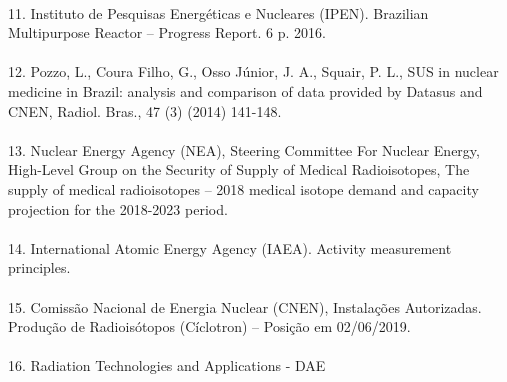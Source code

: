 \documentclass[12pt]{article}
\begin{document}
\\
11.  Instituto  de  Pesquisas  Energéticas  e  Nucleares 
(IPEN).  Brazilian  Multipurpose  Reactor  –  Progress 
Report.  6  p.  2016. 
\\
\\
12.  Pozzo,  L., Coura  Filho,  G., Osso  Júnior,  J.  A., 
Squair,  P.  L.,  SUS  in  nuclear  medicine  in  Brazil: 
analysis and comparison of data provided by Datasus 
and  CNEN,  Radiol.  Bras.,  47  (3)  (2014)  141-148. 
\\
\\
13.  Nuclear  Energy  Agency  (NEA),  Steering 
Committee For Nuclear Energy, High-Level Group on 
the Security of Supply of Medical Radioisotopes, The 
supply of medical radioisotopes – 2018 medical isotope 
demand  and  capacity  projection  for  the  2018-2023 
period. 
\\ 
\\
14.  International  Atomic  Energy  Agency  (IAEA). 
Activity  measurement  principles. 
\\
\\
15. Comissão Nacional de Energia Nuclear (CNEN), 
Instalações  Autorizadas.  Produção  de  Radioisótopos 
(Cíclotron)  –  Posição  em  02/06/2019. 
\\
\\
16. Radiation Technologies and Applications - DAE
\end{document}
